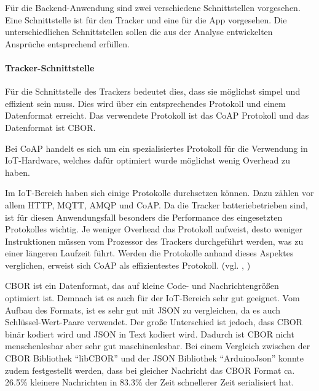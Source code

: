 Für die Backend-Anwendung sind zwei verschiedene Schnittstellen vorgesehen.
Eine Schnittstelle ist für den Tracker und eine für die App vorgesehen.
Die unterschiedlichen Schnittstellen sollen die aus der Analyse entwickelten Ansprüche entsprechend erfüllen.

\paragraph{Tracker-Schnittstelle}
Für die Schnittstelle des Trackers bedeutet dies, dass sie möglichst simpel und effizient sein muss.
Dies wird über ein entsprechendes Protokoll und einem Datenformat erreicht.
Das verwendete Protokoll ist das \acrfull{CoAP} Protokoll und das Datenformat ist \acrfull{CBOR}.

Bei \gls{CoAP} handelt es sich um ein spezialisiertes Protokoll für die Verwendung in
\gls{IoT}-Hardware, welches dafür optimiert wurde möglichst wenig \gls{Overhead} zu haben.

Im \gls{IoT}-Bereich haben sich einige Protokolle durchsetzen können. Dazu zählen vor allem
\gls{HTTP}, \gls{MQTT}, \gls{AMQP} und \gls{CoAP}.
Da die Tracker batteriebetrieben sind, ist für diesen Anwendungsfall besonders die Performance des
eingesetzten Protokolles wichtig. Je weniger Overhead das Protokoll aufweist, desto weniger
Instruktionen müssen vom Prozessor des Trackers durchgeführt werden, was zu einer längeren Laufzeit
führt.
Werden die Protokolle anhand dieses Aspektes verglichen, erweist sich \gls{CoAP} als effizientestes
Protokoll. (vgl. \cite{Dizdarevic2019}, \cite{Naik2017})

\gls{CBOR} ist ein Datenformat, das auf kleine Code- und Nachrichtengrößen optimiert ist.
Demnach ist es auch für der \gls{IoT}-Bereich sehr gut geeignet.
Vom Aufbau des Formats, ist es sehr gut mit \gls{JSON} zu vergleichen, da es auch Schlüssel-Wert-Paare verwendet.
Der große Unterschied ist jedoch, dass \gls{CBOR} binär kodiert wird und \gls{JSON} in Text kodiert wird.
Dadurch ist \gls{CBOR} nicht menschenlesbar aber sehr gut maschinenlesbar.
Bei einem Vergleich zwischen der \gls{CBOR} Bibliothek \enquote{libCBOR} und der \gls{JSON} Bibliothek \enquote{ArduinoJson}
konnte zudem festgestellt werden, dass bei gleicher Nachricht das \gls{CBOR} Format ca. 26.5\% kleinere Nachrichten
in 83.3\% der Zeit schnellerer Zeit serialisiert hat.



